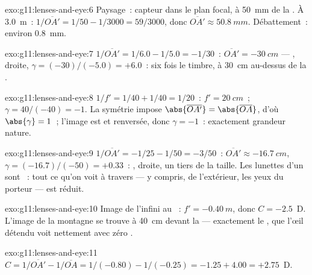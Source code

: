 \begin{solution}{exo:g11:lenses-and-eye:6}
Paysage~: capteur dans le plan focal, à \qty{50}{mm} de la
. À \qty{3.0}{m}~:
$1/\overline{OA'} = 1/50 - 1/3000 = 59/3000$, donc
$\overline{OA'} \approx \qty{50.8}{mm}$. Débattement~: environ
\qty{0.8}{mm}.
\end{solution}

\begin{solution}{exo:g11:lenses-and-eye:7}
$1/\overline{OA'} = 1/6.0 - 1/5.0 = -1/30$~:
$\overline{OA'} = \qty{-30}{cm}$ --- ,
droite, $\gamma = (-30)/(-5.0) = +6.0$~: six fois le timbre, à
\qty{30}{cm} au-dessus de la .
\end{solution}

\begin{solution}{exo:g11:lenses-and-eye:8}
$1/f' = 1/40 + 1/40 = 1/20$~: $f' = \qty{20}{cm}$~;
$\gamma = 40/(-40) = -1$. La symétrie
impose
$\abs{\overline{OA'}} = \abs{\overline{OA}}$, d'où
$\abs{\gamma} = 1$~; l'image est  et
renversée, donc $\gamma = -1$~: exactement grandeur nature.
\end{solution}

\begin{solution}{exo:g11:lenses-and-eye:9}
$1/\overline{OA'} = -1/25 - 1/50 = -3/50$~:
$\overline{OA'} \approx \qty{-16.7}{cm}$,
$\gamma = (-16.7)/(-50) = +0.33$~: ,
droite, un tiers de la taille. Les lunettes d'un  sont
~: tout ce qu'on voit à travers --- y
compris, de l'extérieur, les yeux du porteur --- est réduit.
\end{solution}

\begin{solution}{exo:g11:lenses-and-eye:10}
Image de l'infini au ~:
$f' = \qty{-0.40}{m}$, donc $C = -2.5$~D. L'image de la montagne se
trouve à \qty{40}{cm} devant la  ---
exactement le , que l'œil détendu voit
nettement avec zéro .
\end{solution}

\begin{solution}{exo:g11:lenses-and-eye:11}
$C = 1/\overline{OA'} - 1/\overline{OA} = 1/(-0.80) - 1/(-0.25)
= -1.25 + 4.00 = +2.75$~D.
\end{solution}

